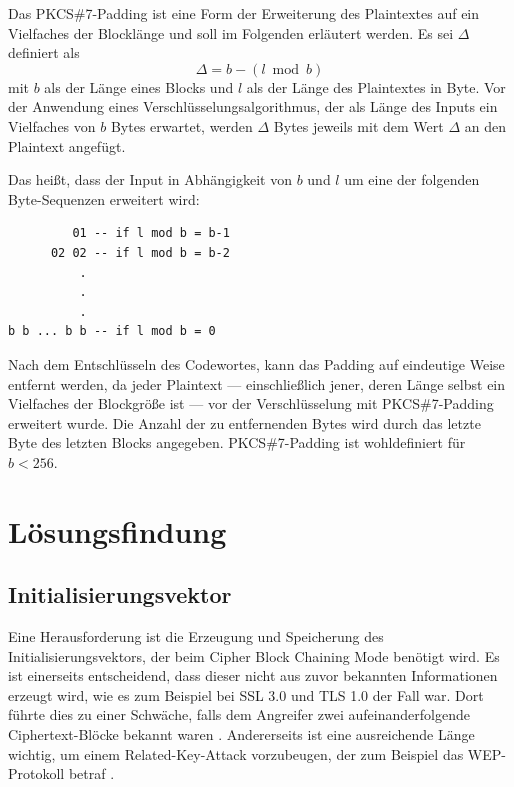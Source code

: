 \documentclass[course=erap]{aspdoc}
\begin{document}
Das PKCS\#7-Padding ist eine Form der Erweiterung des Plaintextes auf ein Vielfaches der Blocklänge und soll im Folgenden erläutert werden. Es sei $\Delta$ definiert als
\[
    \Delta = b - (l \bmod b)
\]
mit $b$ als der Länge eines Blocks und $l$ als der Länge des Plaintextes in Byte. Vor der Anwendung eines Verschlüsselungsalgorithmus, der als Länge des Inputs ein Vielfaches von $b$ Bytes erwartet, werden $\Delta$ Bytes jeweils mit dem Wert $\Delta$ an den Plaintext angefügt.\cite[p.28]{rfc5652}\bigbreak

Das heißt, dass der Input in Abhängigkeit von $b$ und $l$ um eine der folgenden Byte-Sequenzen erweitert wird:

\begin{samepage}
\begin{verbatim}
         01 -- if l mod b = b-1
      02 02 -- if l mod b = b-2
          .
          .
          .
b b ... b b -- if l mod b = 0
\end{verbatim}
\end{samepage}

Nach dem Entschlüsseln des Codewortes, kann das Padding auf eindeutige Weise entfernt werden, da jeder Plaintext --- einschließlich jener, deren Länge selbst ein Vielfaches der Blockgröße ist --- vor der Verschlüsselung mit PKCS\#7-Padding erweitert wurde. Die Anzahl der zu entfernenden Bytes wird durch das letzte Byte des letzten Blocks angegeben. PKCS\#7-Padding ist wohldefiniert für $b < 256$.\cite[p.28]{rfc5652}

\section{Lösungsfindung}

\subsection{Initialisierungsvektor}
\label{sec:Initialisierungsvektor}
Eine Herausforderung ist die Erzeugung und Speicherung des Initialisierungsvektors, der beim Cipher Block Chaining Mode benötigt wird. Es ist einerseits entscheidend, dass dieser nicht aus zuvor bekannten Informationen erzeugt wird, wie es zum Beispiel bei SSL 3.0 und TLS 1.0 der Fall war. Dort führte dies zu einer Schwäche, falls dem Angreifer zwei aufeinanderfolgende Ciphertext-Blöcke bekannt waren \cite{ssltls}. Andererseits ist eine ausreichende Länge wichtig, um einem Related-Key-Attack vorzubeugen, der zum Beispiel das WEP-Protokoll betraf \cite{wep}.\bigbreak
\end{document}
